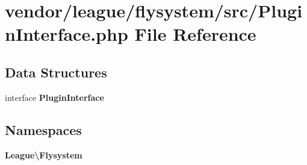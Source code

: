 \section{vendor/league/flysystem/src/\+Plugin\+Interface.php File Reference}
\label{_plugin_interface_8php}
\subsection*{Data Structures}
\begin{DoxyCompactItemize}
\item 
interface {\bf Plugin\+Interface}
\end{DoxyCompactItemize}
\subsection*{Namespaces}
\begin{DoxyCompactItemize}
\item 
 {\bf League\textbackslash{}\+Flysystem}
\end{DoxyCompactItemize}
